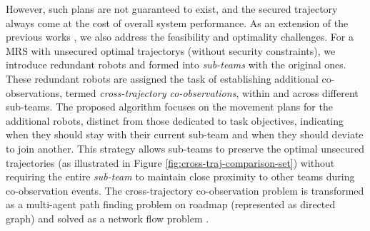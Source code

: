 \documentclass[10pt,twocolumn,twoside]{IEEEtran}
\begin{document}
However, such plans are not guaranteed to exist, and the secured trajectory always come at the cost of overall system performance. As an extension of the previous works \cite{yang2020multi,yang2021multi}, we also address the feasibility and optimality challenges. For a MRS with unsecured optimal trajectorys (without security constraints), we introduce redundant robots and formed into \emph{sub-teams} with the original ones. These redundant robots are assigned the task of establishing additional co-observations, termed \emph{cross-trajectory co-observations}, within and across different sub-teams. The proposed algorithm focuses on the movement plans for the additional robots, distinct from those dedicated to task objectives, indicating when they should stay with their current sub-team and when they should deviate to join another. This strategy allows sub-teams to preserve the optimal unsecured trajectories (as illustrated in Figure \ref{fig:cross-traj-comparison-set}) without requiring the entire \emph{sub-team} to maintain close proximity to other teams during co-observation events. The cross-trajectory co-observation problem is transformed as a multi-agent path finding problem on roadmap (represented as directed graph) and solved as a network flow problem \cite{yu2013multi}.
\end{document}
